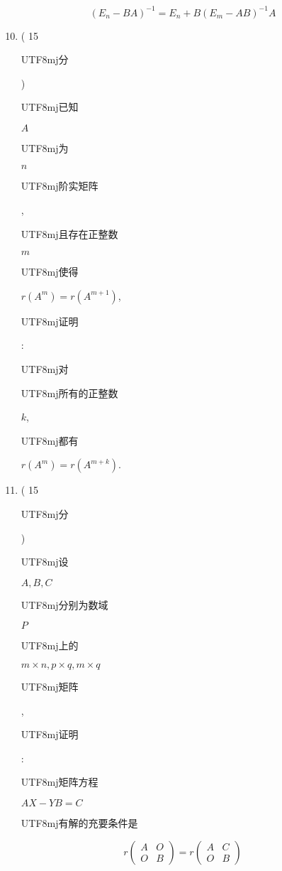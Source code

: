 \documentclass[10pt]{article}
\begin{document}
$$
\left(E_{n}-B A\right)^{-1}=E_{n}+B\left(E_{m}-A B\right)^{-1} A
$$

\begin{enumerate}
  \setcounter{enumi}{9}
  \item ( 15 \begin{CJK}{UTF8}{mj}分\end{CJK}) \begin{CJK}{UTF8}{mj}已知\end{CJK} $A$ \begin{CJK}{UTF8}{mj}为\end{CJK} $n$ \begin{CJK}{UTF8}{mj}阶实矩阵\end{CJK}, \begin{CJK}{UTF8}{mj}且存在正整数\end{CJK} $m$ \begin{CJK}{UTF8}{mj}使得\end{CJK} $r\left(A^{m}\right)=r\left(A^{m+1}\right)$, \begin{CJK}{UTF8}{mj}证明\end{CJK}: \begin{CJK}{UTF8}{mj}对\end{CJK} \begin{CJK}{UTF8}{mj}所有的正整数\end{CJK} $k$, \begin{CJK}{UTF8}{mj}都有\end{CJK} $r\left(A^{m}\right)=r\left(A^{m+k}\right)$.

  \item ( 15 \begin{CJK}{UTF8}{mj}分\end{CJK}) \begin{CJK}{UTF8}{mj}设\end{CJK} $A, B, C$ \begin{CJK}{UTF8}{mj}分别为数域\end{CJK} $P$ \begin{CJK}{UTF8}{mj}上的\end{CJK} $m \times n, p \times q, m \times q$ \begin{CJK}{UTF8}{mj}矩阵\end{CJK}, \begin{CJK}{UTF8}{mj}证明\end{CJK}: \begin{CJK}{UTF8}{mj}矩阵方程\end{CJK} $A X-Y B=C$ \begin{CJK}{UTF8}{mj}有解的充要条件是\end{CJK}

\end{enumerate}
$$
r\left(\begin{array}{ll}
A & O \\
O & B
\end{array}\right)=r\left(\begin{array}{ll}
A & C \\
O & B
\end{array}\right)
$$
\end{document}
